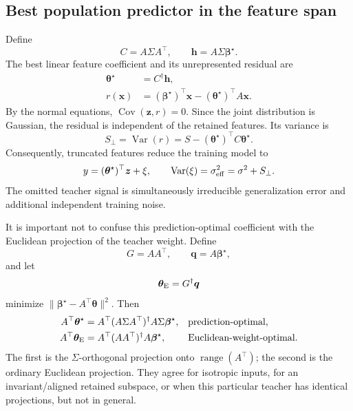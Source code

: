 \documentclass[11pt]{article}
\newcommand{\Var}{\operatorname{Var}}
\newcommand{\Cov}{\operatorname{Cov}}
\newcommand{\bstar}{\bm\beta^{\star}}
\newcommand{\tstar}{\bm\theta^{\star}}
\begin{document}
\subsection{Best population predictor in the feature span}

Define
\begin{equation}
  C=A\Sigma A^{\top},\qquad
  \bm h=A\Sigma\bstar.
\end{equation}
The best linear feature coefficient and its unrepresented residual are
\begin{align}
  \tstar &= C^{\dagger}\bm h,\\
  r(\bm x)&=(\bstar)^{\top}\bm x-(\tstar)^{\top}A\bm x.
\end{align}
By the normal equations, $\Cov(\bm z,r)=0$.  Since the joint distribution is
Gaussian, the residual is independent of the retained features.  Its variance
is
\begin{equation}
  S_{\perp}=\Var(r)=S-(\tstar)^{\top}C\tstar.
  \label{eq:residual-signal}
\end{equation}
Consequently, truncated features reduce the training model to
\begin{equation}
  y=(\tstar)^{\top}\bm z+\xi,\qquad
  \Var(\xi)=\sigma_{\rm eff}^2=\sigma^2+S_{\perp}.
  \label{eq:effective-noise}
\end{equation}
The omitted teacher signal is simultaneously irreducible generalization error
and additional independent training noise.

It is important not to confuse this prediction-optimal coefficient with the
Euclidean projection of the teacher weight.  Define
\begin{equation}
  G=A A^{\top},\qquad \bm q=A\bstar,
\end{equation}
and let
\begin{equation}
  \bm\theta_{\rm E}=G^{\dagger}\bm q
\end{equation}
minimize $\lVert\bstar-A^{\top}\bm\theta\rVert^2$.  Then
\begin{align}
  A^{\top}\tstar
    &=A^{\top}(A\Sigma A^{\top})^{\dagger}A\Sigma\bstar,
    &&\text{prediction-optimal,}\label{eq:sigma-projection}\\
  A^{\top}\bm\theta_{\rm E}
    &=A^{\top}(AA^{\top})^{\dagger}A\bstar,
    &&\text{Euclidean-weight-optimal.}\label{eq:euclidean-projection}
\end{align}
The first is the $\Sigma$-orthogonal projection onto
$\operatorname{range}(A^{\top})$; the second is the ordinary Euclidean
projection.  They agree for isotropic inputs, for an invariant/aligned retained
subspace, or when this particular teacher has identical projections, but not
in general.
\end{document}
